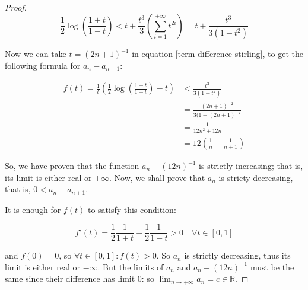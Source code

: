 \documentclass[12pt,a4paper]{report}
\numberwithin{equation}{section}
\theoremstyle{definition}
\theoremstyle{remark}
\begin{document}
\begin{proof}
\begin{equation}
\frac 12 \log \left( \frac{1+t}{1-t} \right) <
t + \frac{t^3}{3} \left(
\sum_{i=1}^{+\infty} t^{2i}
\right) = t + \frac{t^3}{3 (1-t^2)}
\end{equation}

Now we can take $t = (2n+1)^{-1}$ in equation \eqref{term-difference-stirling}, to get the following formula for $a_n - a_{n+1}$:

\begin{align}
f(t) = \frac 1t \left(
\frac 12 \log \left(\frac{1+t}{1-t}\right) -t
\right) &<
\frac{t^2}{3(1-t^2)} \\
&=
\frac{(2n+1)^{-2}}{3(1-(2n+1)^{-2}} \\ 
&= \frac 1{12n^2 + 12n} \\ 
&= 12 \left(\frac 1n - \frac{1}{n+1}\right)
\end{align}

So, we have proven that the function $a_n - (12 n) ^{-1}$ is strictly increasing; that is, its limit is either real or $+\infty$. Now, we shall prove that $a_n$ is stricty decreasing, that is, $0<a_n - a_{n+1}$.

It is enough for $f(t)$ to satisfy this condition:

\begin{equation}
f'(t) =\frac 12 \frac{1}{1+t} + \frac{1}{2} \frac{1}{1-t} > 0 \quad \forall t \in [0, 1]
\end{equation}

and $f(0) = 0$, so $\forall t \in [0, 1]: f(t)>0$. So $a_n$ is strictly decreasing, thus its limit is either real or $-\infty$. But the limits of $a_n$ and $a_n - (12n)^{-1}$ must be the same since their difference has limit 0: so $\lim_{n\rightarrow +\infty} a_n = c \in \mathbb{R}$.

\end{proof}

\tableofcontents
\end{document}
